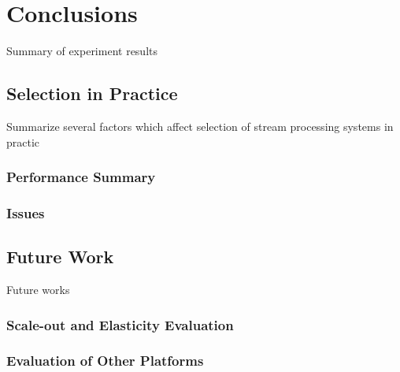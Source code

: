 \chapter{Conclusions}
Summary of experiment results 

\section{Selection in Practice}
Summarize several factors which affect selection of stream processing systems in practic

\subsection{Performance Summary}
\subsection{Issues }

\section{Future Work}
Future works

\subsection{Scale-out and Elasticity Evaluation}
\subsection{Evaluation of Other Platforms}

\clearpage